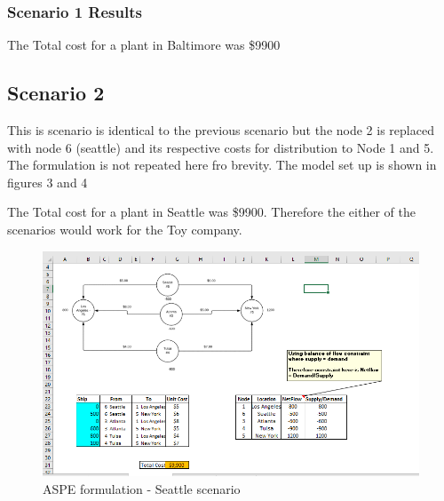 \documentclass[]{article}
\begin{document}
\subsubsection{Scenario 1 Results}\label{scenario-1-results}

The Total cost for a plant in Baltimore was \$9900

\pagebreak

\subsection{Scenario 2}\label{scenario-2}

This is scenario is identical to the previous scenario but the node 2 is
replaced with node 6 (seattle) and its respective costs for distribution
to Node 1 and 5. The formulation is not repeated here fro brevity. The
model set up is shown in figures 3 and 4

The Total cost for a plant in Seattle was \$9900. Therefore the either
of the scenarios would work for the Toy company.

\begin{figure}[h]

{\centering \includegraphics[width=11.39in]{Figures/Homework3/p1b} 

}

\caption{ASPE formulation - Seattle scenario}\label{fig:unnamed-chunk-4}
\end{figure}
\end{document}
